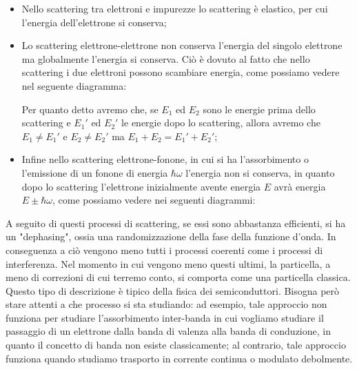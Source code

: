 \begin{itemize}[leftmargin=0.5cm]
    \item Nello scattering tra elettroni e impurezze lo scattering è elastico, per cui l'energia dell'elettrone si conserva;
    \item Lo scattering elettrone-elettrone non conserva l'energia del singolo elettrone ma globalmente l'energia si conserva. Ciò è dovuto al fatto che nello scattering i due elettroni possono scambiare energia, come possiamo vedere nel seguente diagramma:
    \begin{figure}[H]
        \centering
    \end{figure}
    Per quanto detto avremo che, se $E_1$ ed $E_2$ sono le energie prima dello scattering e $E_1'$ ed $E_2'$ le energie dopo lo scattering, allora avremo che $E_1 \neq E_1'$ e $E_2 \neq E_2'$ ma $E_1 + E_2 = E_1' + E_2'$;
    \item Infine nello scattering elettrone-fonone, in cui si ha l'assorbimento o l'emissione di un fonone di energia $\hbar \omega$ l'energia non si conserva, in quanto dopo lo scattering l'elettrone inizialmente avente energia $E$ avrà energia $E \pm \hbar \omega$, come possiamo vedere nei seguenti diagrammi:
    \begin{figure}[H]
        \centering
    \end{figure}
\end{itemize}
A seguito di questi processi di scattering, se essi sono abbastanza efficienti, si ha un "dephasing", ossia una randomizzazione della fase della funzione d'onda. In conseguenza a ciò vengono meno tutti i processi coerenti come i processi di interferenza. Nel momento in cui vengono meno questi ultimi, la particella, a meno di correzioni di cui terremo conto, si comporta come una particella classica. Questo tipo di descrizione è tipico della fisica dei semiconduttori. Bisogna però stare attenti a che processo si sta studiando: ad esempio, tale approccio non funziona per studiare l'assorbimento inter-banda in cui vogliamo studiare il passaggio di un elettrone dalla banda di valenza alla banda di conduzione, in quanto il concetto di banda non esiste classicamente; al contrario, tale approccio funziona quando studiamo trasporto in corrente continua o modulato debolmente.\\
